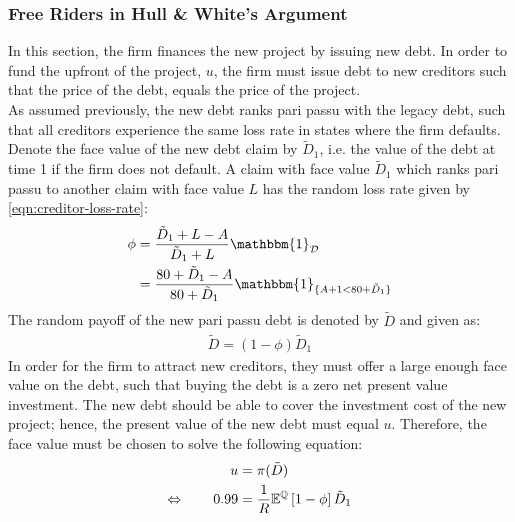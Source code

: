 \documentclass[main.tex]{subfiles}
\begin{document}
    \subsubsection{Free Riders in Hull \& White's Argument}
    \label{sec:example-risk-free-project-debt-issuance}
        In this section, the firm finances the new project by issuing new debt.
        In order to fund the upfront of the project, $u$, 
        the firm must issue debt to new creditors such that the price of the debt, 
        equals the price of the project.
        \\
        As assumed previously, the new debt ranks pari passu with the legacy debt, 
        such that all creditors experience the same loss rate in states where the firm defaults.
        Denote the face value of the new debt claim by $\tilde{D}_{1}$, 
        i.e. the value of the debt at time 1 if the firm does not default. 
        A claim with face value $\tilde{D}_{1}$ which ranks pari passu to another claim 
        with face value $L$ has the random loss rate given by \cref{eqn:creditor-loss-rate}:
            \begin{align*}
                \phi
                &=
                    \frac{
                        \tilde{D}_{1} + L - A
                    }{
                        \tilde{D}_{1} + L
                    }
                    \mathbbm{1}_{\mathcal{D}}
                \nonumber \\
                &=
                    \frac{
                        \num{80} + \tilde{D}_{1} - A
                    }{
                        \num{80} + \tilde{D}_{1}
                    }
                    \mathbbm{1}_{\{A + \num{1} < \num{80} + \tilde{D}_{1}\}} 
            \end{align*}
        The random payoff of the new pari passu debt is denoted by $\tilde{D}$ and given as:
            \begin{align*}
                \tilde{D}
                    = (1 - \phi)\tilde{D}_{1}
            \end{align*}
        In order for the firm to attract new creditors,
        they must offer a large enough face value on the debt, 
        such that buying the debt is a zero net present value investment.
        The new debt should be able to cover the investment cost of the new project;
        hence, the present value of the new debt must equal $u$.
        Therefore, the face value must be chosen to solve the following equation:
            \begin{align*}
                u &= \pi(\tilde{D}) \\
                \Leftrightarrow  \qquad
                \num{0.99} 
                &= 
                    \frac{1}{R}
                    \mathbb{E}^{\mathbb{Q}}\left[
                        1 - \phi
                    \right] 
                    \tilde{D}_{1}
            \end{align*}
\end{document}

